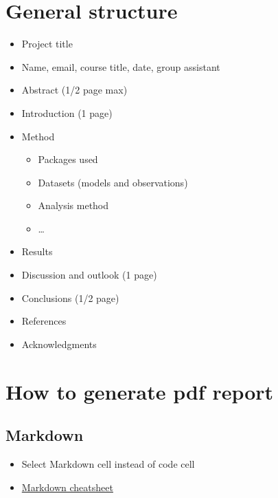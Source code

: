 \documentclass[10pt,parskip=half,
	toc=sectionentrywithdots,
	bibliography=totocnumbered,
	captions=tableheading,numbers=noendperiod]{scrartcl}
\providecommand{\tightlist}{%
  \setlength{\itemsep}{0pt}\setlength{\parskip}{0pt}}
\begin{document}
		\begingroup
    \let\cleardoublepage\relax
    \let\clearpage\relax\tableofcontents\listoffigures\listoftables{}
    \endgroup

\section{General structure}\label{general-structure}

\begin{itemize}
\tightlist
\item
  Project title
\item
  Name, email, course title, date, group assistant
\item
  Abstract (1/2 page max)
\item
  Introduction (1 page)
\item
  Method

  \begin{itemize}
  \tightlist
  \item
    Packages used
  \item
    Datasets (models and observations)
  \item
    Analysis method
  \item
    \ldots{}
  \end{itemize}
\item
  Results
\item
  Discussion and outlook (1 page)
\item
  Conclusions (1/2 page)
\item
  References
\item
  Acknowledgments
\end{itemize}

\section{How to generate pdf report}\label{how-to-generate-pdf-report}

\subsection{Markdown}\label{markdown}

\begin{itemize}
\tightlist
\item
  Select Markdown cell instead of code cell
\item
  \href{https://github.com/adam-p/markdown-here/wiki/Markdown-Cheatsheet}{Markdown
  cheatsheet}
\end{itemize}
\end{document}
